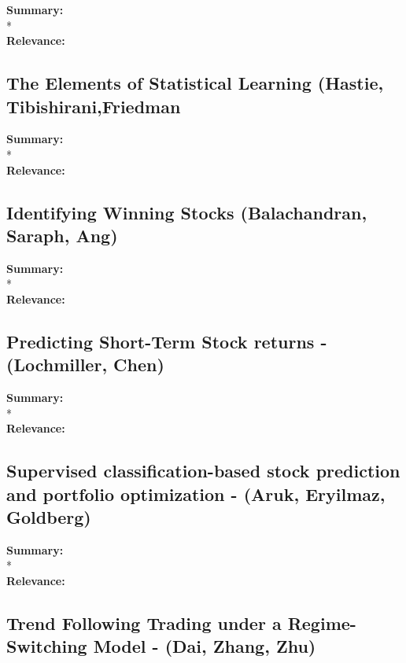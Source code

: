 \documentclass[11pt]{article}
\begin{document}
\textbf{Summary: }
\\*
\\
\textbf{Relevance: }

\subsection{\textnormal{The Elements of Statistical Learning (Hastie, Tibishirani,Friedman}}

\textbf{Summary: }
\\*
\\
\textbf{Relevance: }

\subsection{\textnormal{ Identifying Winning Stocks (Balachandran, Saraph, Ang)}}

\textbf{Summary: }
\\*
\\
\textbf{Relevance: }


\subsection{\textnormal{Predicting Short-Term Stock returns - (Lochmiller, Chen)}}

\textbf{Summary: }
\\*
\\
\textbf{Relevance: } 

\subsection{\textnormal{Supervised classification-based stock prediction and portfolio optimization - (Aruk, Eryilmaz, Goldberg)}}

\textbf{Summary: }
\\*
\\
\textbf{Relevance: }

\pagebreak
\subsection{\textnormal{Trend Following Trading under a Regime-Switching Model - (Dai, Zhang, Zhu)}}
\end{document}
